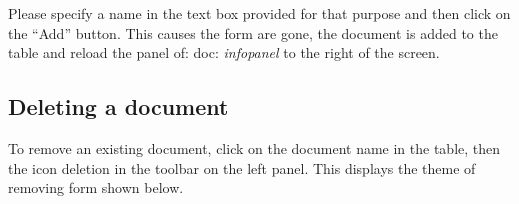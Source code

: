 \documentclass[letterpaper,10pt,english]{sphinxmanual}
\begin{document}

Please specify a name in the text box provided for that purpose and then click on the ``Add'' button. This causes the form are gone, the document is added to the table and reload the panel of: doc: \emph{infopanel} to the right of the screen.


\subsection{Deleting a document}
\label{documents/docslist:supprimer-un-document}
To remove an existing document, click on the document name in the table, then the icon deletion in the toolbar on the left panel. This displays the theme of removing form shown below.

\end{document}
